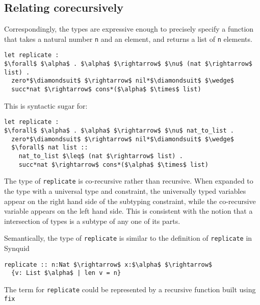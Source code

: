 \documentclass[sigplan,screen]{acmart}
\begin{document}
\subsection{Relating corecursively}

\noindent Correspondingly, the types are expressive enough to precisely specify
a function that takes a natural number \lstinline{n} 
and an element, and returns a list of \lstinline{n} elements.

\begin{lstlisting}[]
let replicate : 
$\forall$ $\alpha$ . $\alpha$ $\rightarrow$ $\nu$ (nat $\rightarrow$ list) .
  zero*$\diamondsuit$ $\rightarrow$ nil*$\diamondsuit$ $\wedge$
  succ*nat $\rightarrow$ cons*($\alpha$ $\times$ list)
\end{lstlisting}



\hfill

\noindent This is syntactic sugar for:

\begin{lstlisting}[]
let replicate : 
$\forall$ $\alpha$ . $\alpha$ $\rightarrow$ $\nu$ nat_to_list .
  zero*$\diamondsuit$ $\rightarrow$ nil*$\diamondsuit$ $\wedge$
  $\forall$ nat list :: 
    nat_to_list $\leq$ (nat $\rightarrow$ list) .
    succ*nat $\rightarrow$ cons*($\alpha$ $\times$ list)
\end{lstlisting}

\hfill

\noindent The type of \lstinline{replicate} is co-recursive rather than recursive. 
When expanded to the type with a universal type and constraint, 
the universally typed variables appear on the right hand side 
of the subtyping constraint, while the co-recursive variable
appears on the left hand side. This is consistent with the notion
that a intersection of types is a subtype of any one of its parts.

\hfill

\noindent Semantically, the type of \lstinline{replicate} is similar to the definition of 
\lstinline{replicate} in Synquid \cite{}    

\begin{lstlisting}[keywords={termination, measure, data, where}]
replicate :: n:Nat $\rightarrow$ x:$\alpha$ $\rightarrow$ 
  {v: List $\alpha$ | len v = n}

\end{lstlisting}

\hfill

\noindent The term for \lstinline{replicate} could be represented by a recursive function built using \lstinline{fix} 
\end{document}
